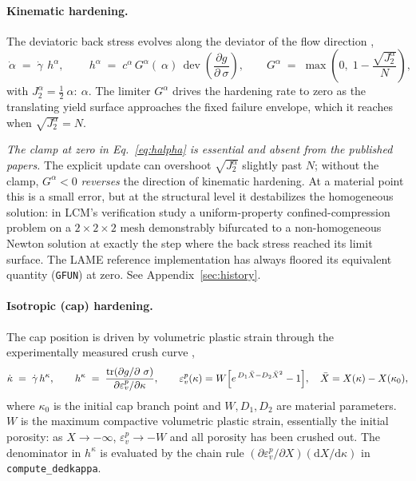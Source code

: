 \documentclass[12pt]{article}
\DeclareMathOperator{\trace}{tr}
\DeclareMathOperator{\dev}{dev}
\newcommand{\stress}{~\sigma}
\newcommand{\backstress}{~\alpha}
\newcommand{\halpha}{~h^{\alpha}}
\begin{document}
\paragraph{Kinematic hardening.}
The deviatoric back stress evolves along the deviator of the flow
direction \citep[Eqs.~41--43]{Sun.Chen.Ostien:2014},
\begin{equation}
  \dot{\backstress} \;=\; \dot\gamma\,\halpha,
  \qquad
  \halpha \;=\; c^{\alpha}\,G^{\alpha}(\backstress)\,
               \dev\!\left(\frac{\partial g}{\partial \stress}\right),
  \qquad
  G^{\alpha} \;=\;
    \max\!\left(0,\; 1 - \frac{\sqrt{J_2^{\alpha}}}{N}\right),
  \label{eq:halpha}
\end{equation}
with $J_2^{\alpha} = \tfrac{1}{2}\backstress:\backstress$. The
limiter $G^\alpha$ drives the hardening rate to zero as the
translating yield surface approaches the fixed failure envelope,
which it reaches when $\sqrt{J_2^\alpha} = N$.

\emph{The clamp at zero in Eq.~\eqref{eq:halpha} is essential and
absent from the published papers.} The explicit update can overshoot
$\sqrt{J_2^\alpha}$ slightly past $N$; without the clamp,
$G^\alpha < 0$ \emph{reverses} the direction of kinematic hardening.
At a material point this is a small error, but at the structural
level it destabilizes the homogeneous solution: in LCM's verification
study a uniform-property confined-compression problem on a
$2 \times 2 \times 2$ mesh demonstrably bifurcated to a
non-homogeneous Newton solution at exactly the step where the back
stress reached its limit surface. The LAME reference implementation
has always floored its equivalent quantity (\texttt{GFUN}) at zero.
See Appendix~\ref{sec:history}.

\paragraph{Isotropic (cap) hardening.}
The cap position is driven by volumetric plastic strain through the
experimentally measured crush curve
\citep[Eqs.~44--46]{Sun.Chen.Ostien:2014},
\begin{equation}
  \dot\kappa \;=\; \dot\gamma\,h^{\kappa},
  \qquad
  h^{\kappa} \;=\;
    \frac{\trace(\partial g/\partial \stress)}
         {\partial \varepsilon_v^p/\partial \kappa},
  \qquad
  \varepsilon_v^p(\kappa)
    = W \Bigl[
        e^{\,D_1 \bar X - D_2 \bar X^2} - 1
      \Bigr],
  \quad \bar X = X(\kappa) - X(\kappa_0),
  \label{eq:kappa}
\end{equation}
where $\kappa_0$ is the initial cap branch point and
$W, D_1, D_2$ are material parameters. $W$ is the maximum
compactive volumetric plastic strain, essentially the initial
porosity: as $X \to -\infty$, $\varepsilon_v^p \to -W$ and all
porosity has been crushed out. The denominator in $h^\kappa$ is
evaluated by the chain rule
$(\partial\varepsilon_v^p/\partial X)(\mathrm{d}X/\mathrm{d}\kappa)$
in \texttt{compute\_dedkappa}.
\end{document}
